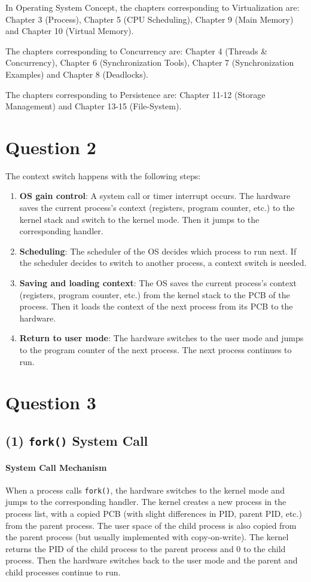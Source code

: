 \documentclass[a4paper,12pt]{article}
\begin{document}
In Operating System Concept, the chapters corresponding to Virtualization are: Chapter 3 (Process), Chapter 5 (CPU Scheduling), Chapter 9 (Main Memory) and Chapter 10 (Virtual Memory).

The chapters corresponding to Concurrency are: Chapter 4 (Threads \& Concurrency), Chapter 6 (Synchronization Tools), Chapter 7 (Synchronization Examples) and Chapter 8 (Deadlocks).

The chapters corresponding to Persistence are: Chapter 11-12 (Storage Management) and Chapter 13-15 (File-System).

\section*{Question 2}

The context switch happens with the following steps:
\begin{enumerate}
	\item \textbf{OS gain control}: A system call or timer interrupt occurs. The hardware saves the current process's context (registers, program counter, etc.) to the kernel stack and switch to the kernel mode. Then it jumps to the corresponding handler.
	\item \textbf{Scheduling}: The scheduler of the OS decides which process to run next. If the scheduler decides to switch to another process, a context switch is needed.
	\item \textbf{Saving and loading context}: The OS saves the current process's context (registers, program counter, etc.) from the kernel stack to the PCB of the process. Then it loads the context of the next process from its PCB to the hardware.
	\item \textbf{Return to user mode}: The hardware switches to the user mode and jumps to the program counter of the next process. The next process continues to run.
\end{enumerate}

\section*{Question 3}

\subsection*{(1) \texttt{fork()} System Call}

\paragraph{System Call Mechanism} When a process calls \texttt{fork()}, the hardware switches to the kernel mode and jumps to the corresponding handler. The kernel creates a new process in the process list, with a copied PCB (with slight differences in PID, parent PID, etc.) from the parent process. The user space of the child process is also copied from the parent process (but usually implemented with copy-on-write). The kernel returns the PID of the child process to the parent process and 0 to the child process. Then the hardware switches back to the user mode and the parent and child processes continue to run.
\end{document}
